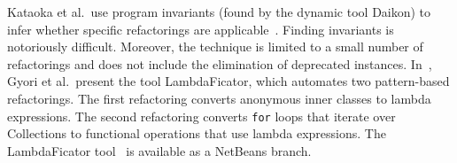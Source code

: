 \documentclass[sigconf,review,anonymous]{acmart}
\begin{document}
%
%
%
%
Kataoka et al.~use program invariants (found by the dynamic tool Daikon) to
infer
%
%
whether specific refactorings are
applicable~\cite{Kataoka:2001:ASP:846228.848644}.  Finding invariants is
notoriously difficult.  Moreover, the technique is limited to a small number
of refactorings and does not include the elimination of deprecated
instances.  In~\cite{conf/sigsoft/GyoriFDL13}, Gyori et al.~present the tool
{\sc LambdaFicator}, which automates two pattern-based refactorings.  The
first refactoring converts anonymous inner classes to lambda expressions. 
The second refactoring converts {\tt for} loops that iterate over
Collections to functional operations that use lambda expressions.  The {\sc
LambdaFicator} tool~\cite{DBLP:conf/icse/FranklinGLD04} is available as a
NetBeans branch.



%
%
%
\end{document}
